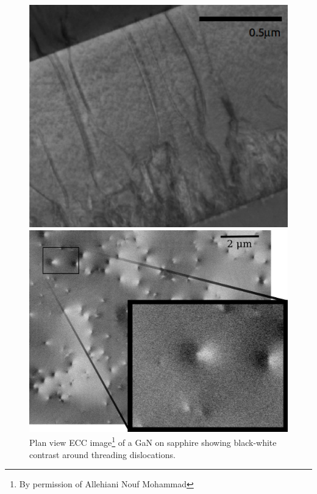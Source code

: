 \begin{figure}
\centering
\noindent\begin{minipage}{0.47\textwidth}
    \centering
    \includegraphics[width=0.9\linewidth, height=0.25\textheight]{Figures/TEM.png}
    \captionsetup{width=0.8\linewidth}
    \caption[magic]{Transversal TEM image\footnote{Taken at the KNC, University of Glasgow. ~~By permission of David Thomson} of an AlGaN on sapphire showing threading dislocations reaching an interface.}
     \label{fig:tem}
\end{minipage}
\;\;\;
\begin{minipage}{0.48\textwidth}
     \centering
     \includegraphics[width=0.9\linewidth, height=0.25\textheight]{Figures/ECCI.png}
      \captionsetup{width=0.8\linewidth}
     \caption[]{Plan view ECC image\footnote{By permission of Allehiani Nouf Mohammad} of a \hkl[0001] GaN on sapphire showing black-white contrast around threading dislocations.}
     \label{fig:ecci}
\end{minipage}
\end{figure}

